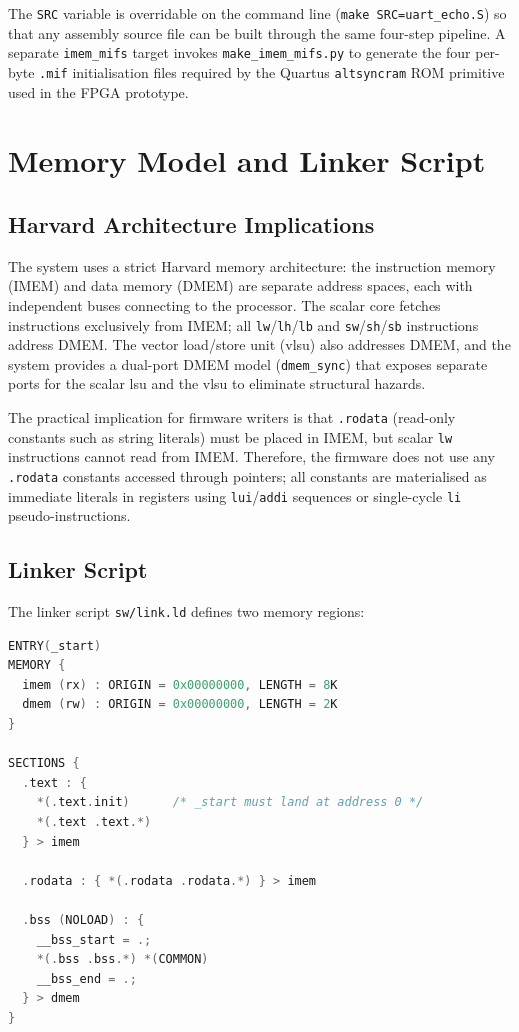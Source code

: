 The \texttt{SRC} variable is overridable on the command line (\texttt{make SRC=uart\_echo.S})
so that any assembly source file can be built through the same four-step pipeline. A
separate \texttt{imem\_mifs} target invokes \texttt{make\_imem\_mifs.py} to generate the
four per-byte \texttt{.mif} initialisation files required by the Quartus
\texttt{altsyncram} ROM primitive used in the FPGA prototype.

\section{Memory Model and Linker Script}
\label{sec:memory_model}

\subsection{Harvard Architecture Implications}

The system uses a strict Harvard memory architecture: the instruction memory (IMEM) and
data memory (DMEM) are separate address spaces, each with independent buses connecting
to the processor. The scalar core fetches instructions exclusively from IMEM; all
\texttt{lw}/\texttt{lh}/\texttt{lb} and \texttt{sw}/\texttt{sh}/\texttt{sb} instructions
address DMEM. The vector load/store unit (\gls{vlsu}) also addresses DMEM, and the
system provides a dual-port DMEM model (\texttt{dmem\_sync}) that exposes separate ports
for the scalar \gls{lsu} and the \gls{vlsu} to eliminate structural hazards.

The practical implication for firmware writers is that \texttt{.rodata} (read-only
constants such as string literals) must be placed in IMEM, but scalar \texttt{lw}
instructions cannot read from IMEM. Therefore, the firmware does not use any
\texttt{.rodata} constants accessed through pointers; all constants are materialised
as immediate literals in registers using \texttt{lui}/\texttt{addi} sequences or
single-cycle \texttt{li} pseudo-instructions.

\subsection{Linker Script}

The linker script \texttt{sw/link.ld} defines two memory regions:

\begin{lstlisting}[language=C, caption={Linker script (sw/link.ld) defining IMEM and DMEM regions}]
ENTRY(_start)
MEMORY {
  imem (rx) : ORIGIN = 0x00000000, LENGTH = 8K
  dmem (rw) : ORIGIN = 0x00000000, LENGTH = 2K
}

SECTIONS {
  .text : {
    *(.text.init)      /* _start must land at address 0 */
    *(.text .text.*)
  } > imem

  .rodata : { *(.rodata .rodata.*) } > imem

  .bss (NOLOAD) : {
    __bss_start = .;
    *(.bss .bss.*) *(COMMON)
    __bss_end = .;
  } > dmem
}
\end{lstlisting}

